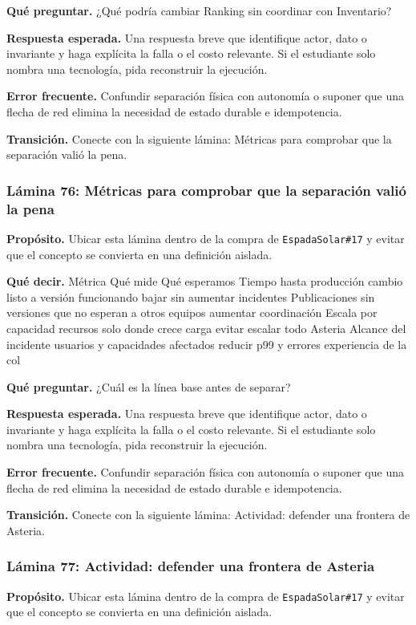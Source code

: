 \documentclass[variant=docente,cover=institutional,mode=screen]{ua-engineering-v6-article}
\begin{document}
\textbf{Qué preguntar.} ¿Qué podría cambiar Ranking sin coordinar con Inventario?

\textbf{Respuesta esperada.} Una respuesta breve que identifique actor, dato o invariante y haga explícita la falla o el costo relevante. Si el estudiante solo nombra una tecnología, pida reconstruir la ejecución.

\textbf{Error frecuente.} Confundir separación física con autonomía o suponer que una flecha de red elimina la necesidad de estado durable e idempotencia.

\textbf{Transición.} Conecte con la siguiente lámina: Métricas para comprobar que la separación valió la pena.

\subsubsection*{Lámina 76: Métricas para comprobar que la separación valió la pena}
\textbf{Propósito.} Ubicar esta lámina dentro de la compra de \texttt{EspadaSolar\#17} y evitar que el concepto se convierta en una definición aislada.

\textbf{Qué decir.} Métrica Qué mide Qué esperamos Tiempo hasta producción cambio listo a versión funcionando bajar sin aumentar incidentes Publicaciones sin versiones que no esperan a otros equipos aumentar coordinación Escala por capacidad recursos solo donde crece carga evitar escalar todo Asteria Alcance del incidente usuarios y capacidades afectados reducir p99 y errores experiencia de la col

\textbf{Qué preguntar.} ¿Cuál es la línea base antes de separar?

\textbf{Respuesta esperada.} Una respuesta breve que identifique actor, dato o invariante y haga explícita la falla o el costo relevante. Si el estudiante solo nombra una tecnología, pida reconstruir la ejecución.

\textbf{Error frecuente.} Confundir separación física con autonomía o suponer que una flecha de red elimina la necesidad de estado durable e idempotencia.

\textbf{Transición.} Conecte con la siguiente lámina: Actividad: defender una frontera de Asteria.

\subsubsection*{Lámina 77: Actividad: defender una frontera de Asteria}
\textbf{Propósito.} Ubicar esta lámina dentro de la compra de \texttt{EspadaSolar\#17} y evitar que el concepto se convierta en una definición aislada.
\end{document}
